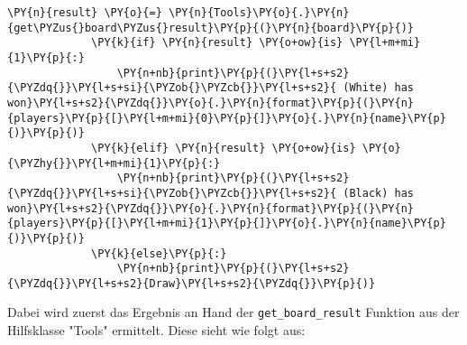 \begin{Verbatim}[commandchars=\\\{\}]
             \PY{n}{result} \PY{o}{=} \PY{n}{Tools}\PY{o}{.}\PY{n}{get\PYZus{}board\PYZus{}result}\PY{p}{(}\PY{n}{board}\PY{p}{)}
             \PY{k}{if} \PY{n}{result} \PY{o+ow}{is} \PY{l+m+mi}{1}\PY{p}{:}
                 \PY{n+nb}{print}\PY{p}{(}\PY{l+s+s2}{\PYZdq{}}\PY{l+s+si}{\PYZob{}\PYZcb{}}\PY{l+s+s2}{ (White) has won}\PY{l+s+s2}{\PYZdq{}}\PY{o}{.}\PY{n}{format}\PY{p}{(}\PY{n}{players}\PY{p}{[}\PY{l+m+mi}{0}\PY{p}{]}\PY{o}{.}\PY{n}{name}\PY{p}{)}\PY{p}{)}
             \PY{k}{elif} \PY{n}{result} \PY{o+ow}{is} \PY{o}{\PYZhy{}}\PY{l+m+mi}{1}\PY{p}{:}
                 \PY{n+nb}{print}\PY{p}{(}\PY{l+s+s2}{\PYZdq{}}\PY{l+s+si}{\PYZob{}\PYZcb{}}\PY{l+s+s2}{ (Black) has won}\PY{l+s+s2}{\PYZdq{}}\PY{o}{.}\PY{n}{format}\PY{p}{(}\PY{n}{players}\PY{p}{[}\PY{l+m+mi}{1}\PY{p}{]}\PY{o}{.}\PY{n}{name}\PY{p}{)}\PY{p}{)}
             \PY{k}{else}\PY{p}{:}
                 \PY{n+nb}{print}\PY{p}{(}\PY{l+s+s2}{\PYZdq{}}\PY{l+s+s2}{Draw}\PY{l+s+s2}{\PYZdq{}}\PY{p}{)}
\end{Verbatim}

    Dabei wird zuerst das Ergebnis an Hand der \texttt{get\_board\_result}
Funktion aus der Hilfsklasse "Tools" ermittelt. Diese sieht wie folgt
aus:

